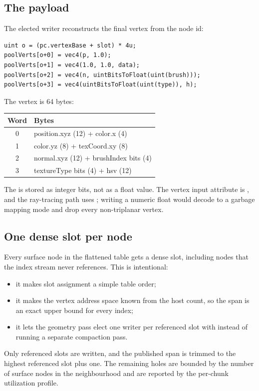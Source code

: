\subsection{The payload}

The elected writer reconstructs the final vertex from the node id:
\begin{lstlisting}[style=glsl,caption={Vertex payload layout.},label={lst:payload}]
uint o = (pc.vertexBase + slot) * 4u;
poolVerts[o+0] = vec4(p, 1.0);
poolVerts[o+1] = vec4(1.0, 1.0, data);
poolVerts[o+2] = vec4(n, uintBitsToFloat(uint(brush)));
poolVerts[o+3] = vec4(uintBitsToFloat(uint(type)), h);
\end{lstlisting}
The vertex is 64 bytes:
\begin{center}
\begin{tabular}{@{}c|l@{}}
\toprule
Word & Bytes\\
\midrule
0 & position.xyz (12) + color.x (4)\\
1 & color.yz (8) + texCoord.xy (8)\\
2 & normal.xyz (12) + brushIndex bits (4)\\
3 & textureType bits (4) + hsv (12)\\
\bottomrule
\end{tabular}
\end{center}
The  is stored as integer bits, not as a float value.
The vertex input attribute is , and the ray-tracing path
uses ; writing a numeric float would decode to a
garbage mapping mode and drop every non-triplanar vertex.

\subsection{One dense slot per node}

Every surface node in the flattened table gets a dense slot, including
nodes that the index stream never references.  This is intentional:
\begin{itemize}
\item it makes slot assignment a simple table order;
\item it makes the vertex address space known from the host count, so the
  span is an exact upper bound for every index;
\item it lets the geometry pass elect one writer per referenced slot with
   instead of running a separate compaction pass.
\end{itemize}
Only referenced slots are written, and the published span is trimmed to the
highest referenced slot plus one.  The remaining holes are bounded by the
number of surface nodes in the neighbourhood and are reported by the
per-chunk utilization profile.
